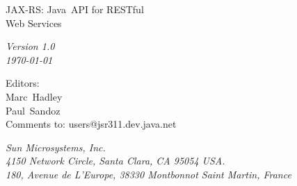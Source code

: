 \begin{titlepage}
\raggedleft

\vspace*{60pt}

{\Huge
\textsf{JAX-RS: Java\texttrademark\ API for RESTful\\\vspace{10pt}
 Web Services}}

\vspace{20pt}

{
\Large\textit{Version 1.0\\
\today}
}

\vspace{40pt}

{\large Editors:\\
Marc\ Hadley\\
Paul\ Sandoz\\
\vspace{10pt}Comments to: users@jsr311.dev.java.net
}

\vspace{80pt}

{\small\textit{Sun Microsystems, Inc.\\
4150 Network Circle, Santa Clara, CA 95054 USA.\\
180, Avenue de L'Europe, 38330 Montbonnot Saint Martin, France}
}
\end{titlepage} 
